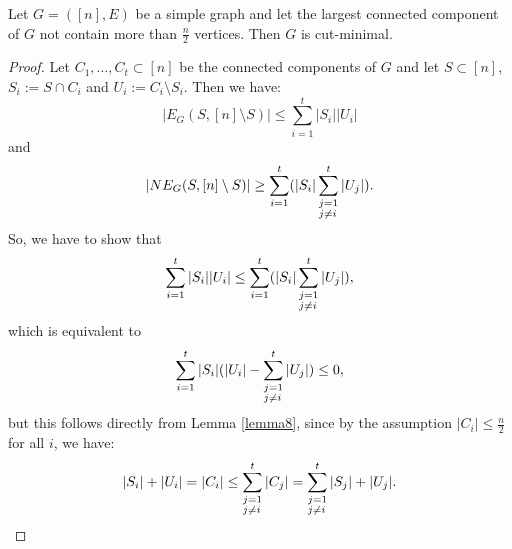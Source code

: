 \begin{prop}
Let \(G=([n],E)\) be a simple graph and let the largest connected component of \(G\) not contain more than \(\frac{n}{2}\) vertices. Then \(G\) is cut-minimal.
\begin{proof}
Let \(C_1,\ldots,C_t\subset [n]\) be the connected components of \(G\) and let \(S\subset [n]\), \(S_i:=S\cap C_i\) and \(U_i:=C_i\setminus S_i\). Then we have:
\[
|E_G(S,[n]\setminus S)|\leq\sum\limits_{i=1}^t|S_i||U_i|
\] 
and
\[
|NE_G(S,[n]\setminus S)|\geq\sum\limits_{i=1}^t(|S_i|\sum_{\begin{subarray}{l}j=1\\ j\neq i\end{subarray}}^t|U_j|).
\]
So, we have to show that
\[
\sum\limits_{i=1}^t|S_i||U_i|\leq\sum\limits_{i=1}^t(|S_i|\sum_{\begin{subarray}{l}j=1\\ j\neq i\end{subarray}}^t|U_j|),
\]
which is equivalent to
\[
\sum\limits_{i=1}^t|S_i|(|U_i|-\sum_{\begin{subarray}{l}j=1\\ j\neq i\end{subarray}}^t|U_j|)\leq 0,
\]
but this follows directly from Lemma \ref{lemma8}, since by the assumption \(|C_i|\leq\frac{n}{2}\) for all \(i\), we have:
\[
|S_i|+|U_i|=|C_i|\leq\sum_{\begin{subarray}{l}j=1\\ j\neq i\end{subarray}}^t|C_j|=\sum_{\begin{subarray}{l}j=1\\ j\neq i\end{subarray}}^t|S_j|+|U_j|.
\]
\end{proof}
\end{prop}

